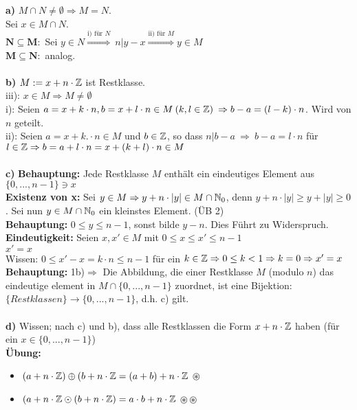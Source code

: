 \begin{bew}
	\textbf{a)} \zz $M\cap N\neq\emptyset\Rightarrow M=N$.\\
	Sei $x\in M\cap N$.\\
	$\mathbf{N\subseteq M:}$ Sei $y\in N\stackrel{\text{i) für } N}{\Rightarrow}\:n|y-x\stackrel{\text{ii) für }M}{\Rightarrow} y\in M$\\
	$\mathbf{M\subseteq N:}$ analog. \\
	\\
	\textbf{b)} \zz $M:=x+n\cdot\mathbb{Z}$ ist Restklasse.\\
	iii): $x\in M\Rightarrow M\neq\emptyset$\\
	i): Seien $a=x+k\cdot n,b=x+l\cdot n\in M\:(k,l\in\mathbb{Z})\:\Rightarrow b-a=(l-k)\cdot n$. Wird von $n$ geteilt.\\
	ii): Seien $a=x+k.\cdot n\in M$ und $b\in\mathbb{Z}$, so dass $n|b-a\:\Rightarrow\:b-a=l\cdot n$ für $l\in\mathbb{Z}\Rightarrow b=a+l\cdot n=x+(k+l)\cdot n\in M$\\
	\\
	\textbf{c)} \textbf{Behauptung:} Jede Restklasse $M$ enthält ein eindeutiges Element aus $\{0,...,n-1\}\ni x$\\
	\textbf{Existenz von x:} Sei $y\in M\Rightarrow y+n\cdot |y|\in M\cap\mathbb{N}_{0}$, denn $y+n\cdot |y|\geq y+|y|\geq0$. Sei nun $y\in M\cap\mathbb{N}_{0}$ ein kleinstes Element. (ÜB 2)\\
	\textbf{Behauptung:} $0\leq y\leq n-1$, sonst bilde $y-n$. Dies Führt zu Widerspruch.\\
	\textbf{Eindeutigkeit:} Seien $x,x'\in M$ mit $0\leq x\leq x'\leq n-1$\\
	\zz $x'=x$\\
	Wissen: $0\leq x'-x=k\cdot n\leq n-1$ für ein $k\in\mathbb{Z}\Rightarrow 0\leq k<1\Rightarrow k=0\Rightarrow x'=x$\\
	\textbf{Behauptung:} 1b)$\Rightarrow$ Die Abbildung, die einer Restklasse $M$ (modulo $n$) das eindeutige element in $M\cap\{0,...,n-1\}$ zuordnet, ist eine Bijektion: $\{Restklassen\}\rightarrow\{0,...,n-1\}$, d.h. c) gilt.\\
	\\
	\textbf{d)} Wissen; nach c) und b), dass alle Restklassen die Form $x+n\cdot\mathbb{Z}$ haben (für ein $x\in\{0,...,n-1\}$)\\
	\textbf{Übung:} \begin{itemize}
		\item $(a+n\cdot\mathbb{Z})\oplus(b+n\cdot\mathbb{Z}=(a+b)+n\cdot\mathbb{Z}$ \hfill $\circledast$
		\item $(a+n\cdot\mathbb{Z}\odot(b+n\cdot\mathbb{Z})=a\cdot b+n\cdot\mathbb{Z}$ \hfill $\circledast\circledast$\\

\end{itemize}
\end{bew}

